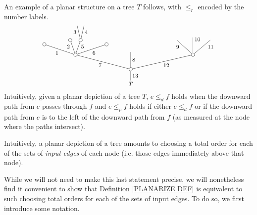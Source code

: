 \documentclass[a4paper,10pt]{article}%
\begin{document}
\begin{example}
An example of a planar structure on a tree $T$ follows, with $\leq_r$ encoded by the number labels.
\[
	\begin{tikzpicture}[grow=up,auto,level distance=2.1em,
	every node/.style = {font=\footnotesize,inner sep=2pt},
	dummy/.style={circle,draw,inner sep=0pt,minimum size=1.75mm}]
		\node at (0,0) {$T$}
			child{node [dummy] {}
				child[sibling distance = 9em]{node [dummy] {}
					child[sibling distance = 2.5em]{
					edge from parent node [near end,swap] {$11$}}
					child[level distance=2.5em]{
					edge from parent node [very near end,swap] {$10$}}				
					child[sibling distance = 2.3em]{
					edge from parent node [near end] {$9$}}
				edge from parent node [swap] {12}}
				child[level distance =2.5em]{
				edge from parent node [swap] {$8$}}
				child[sibling distance = 8em]{node [dummy] {}
					child[sibling distance =3em, level distance = 1.5 em]{node [dummy] {}
					edge from parent node [swap] {$6$}}
					child[sibling distance = 1.5em]{node [dummy] {}
						child[sibling distance =1em]{
						edge from parent node [swap,near end] {$4$}}
						child[sibling distance =1em]{
						edge from parent node [near end] {$3$}}
					edge from parent node [very near end,swap] {$5$}}
					child[sibling distance =1.5em]{node [dummy] {}
					edge from parent node [very near end] {$2$}}
					child[sibling distance =3em,level distance =1.5em]{node [dummy] {}
					edge from parent node {$1$}}
				edge from parent node {$7$}}
			edge from parent node [swap] {$13$}};
	\end{tikzpicture}
\]
Intuitively, given a planar depiction of a tree $T$, $e \leq_d f$ holds when the downward path from $e$ passes through $f$
and $e \leq_p f$ holds if either
$e \leq_d f$ or if the downward path from $e$ is to the left of the downward path from $f$ (as measured at the node where the paths intersect).
\end{example}



Intuitively, a planar depiction of a tree amounts to choosing a total order for each of the sets of \textit{input edges} of each node (i.e. those edges immediately above that node).

While we will not need to make this last statement precise, we will nonetheless find it convenient to show that Definition \ref{PLANARIZE DEF} is equivalent to such choosing total orders for each of the sets of input edges.
To do so, we first introduce some notation.
\end{document}
